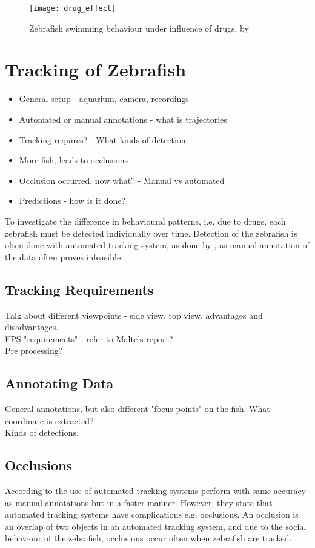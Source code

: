 \begin{figure}[h]
	\centering
	\texttt{[image: drug\_effect]}
	\caption{Zebrafish swimming behaviour under influence of drugs, by \cite{Stewart2015}}
	\label{fig:drug_effect}
\end{figure}



\section{Tracking of Zebrafish}

\begin{itemize}
	\item General setup - aquarium, camera, recordings
	\item Automated or manual annotations - what is trajectories
	\item Tracking requires? - What kinds of detection
	\item More fish, leads to occlusions
	\item Occlusion occurred, now what? - Manual vs automated
	\item Predictions - how is it done?	
\end{itemize}

To investigate the difference in behavioural patterns, i.e. due to drugs, each zebrafish must be detected individually over time. Detection of the zebrafish is often done with automated tracking system, as done by \cite{Stewart2015}, as manual annotation of the data often proves infeasible.

\subsection{Tracking Requirements}
Talk about different viewpoints - side view, top view, advantages and disadvantages.\\
FPS "requirements" - refer to Malte's report?\\
Pre processing?
\subsection{Annotating Data}
General annotations, but also different "focus points" on the fish. What coordinate is extracted?\\
Kinds of detections.

\subsection{Occlusions}
According to  \cite{Green2012} the use of automated tracking systems perform with same accuracy as manual annotations but in a faster manner. However, they state that automated tracking systems have complications e.g. occlusions. An occlusion is an overlap of two objects in an automated tracking system, and due to the social behaviour of the zebrafish, occlusions occur often when zebrafish are tracked.

